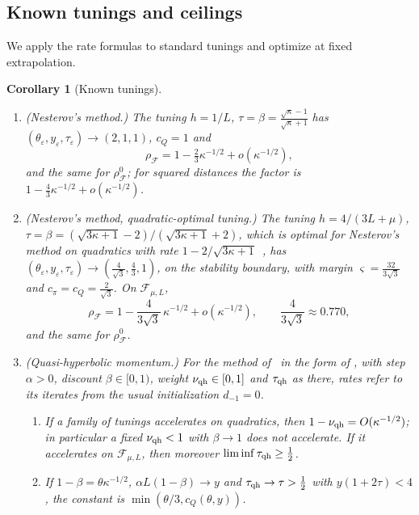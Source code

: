 \documentclass[11pt]{article}
\newtheorem{corollary}[theorem]{Corollary}
\theoremstyle{definition}
\theoremstyle{remark}
\newcommand{\cF}{\mathcal F}
\newcommand{\rhoF}{\rho_{\cF}}
\newcommand{\rhoz}{\rho_{\cF}^{0}}
\newcommand{\cQ}{c_{Q}}
\newcommand{\cpi}{c_{\pi}}
\begin{document}
\subsection{Known tunings and ceilings}
\label{sec:known}

We apply the rate formulas to standard tunings and optimize at fixed extrapolation.

\begin{corollary}[Known tunings]\label{cor:B}
\leavevmode
\begin{enumerate}[label=\textup{(\roman*)}]
\item \textup{(Nesterov's method.)}  The tuning \(h=1/L\), \(\tau=\beta=\frac{\sqrt\kappa-1}{\sqrt\kappa+1}\)
has \((\theta_\varepsilon,y_\varepsilon,\tau_\varepsilon)\to(2,1,1)\), \(\cQ=1\) and
\[
\rhoF=1-\tfrac23\kappa^{-1/2}+o(\kappa^{-1/2}),
\]
and the same for \(\rhoz\); for squared distances the factor is
\(1-\frac43\kappa^{-1/2}+o(\kappa^{-1/2})\).
\item \textup{(Nesterov's method, quadratic-optimal tuning.)}  The tuning
\(h=4/(3L+\mu)\), \(\tau=\beta=(\sqrt{3\kappa+1}-2)/(\sqrt{3\kappa+1}+2)\), which is optimal for Nesterov's
method on quadratics with rate \(1-2/\sqrt{3\kappa+1}\)~\cite[Proposition~1]{LRP16}, has
\((\theta_\varepsilon,y_\varepsilon,\tau_\varepsilon)\to(\frac4{\sqrt3},\frac43,1)\), on the stability boundary, with margin \(\varsigma=\frac{32}{3\sqrt3}\) and
\(\cpi=\cQ=\frac2{\sqrt3}\).  On \(\cF_{\mu,L}\),
\[
\rhoF=1-\frac4{3\sqrt3}\,\kappa^{-1/2}+o(\kappa^{-1/2}),\qquad \frac4{3\sqrt3}\approx0.770,
\]
and the same for \(\rhoz\).
\item \textup{(Quasi-hyperbolic momentum.)}  For the method of~\cite{MY19} in the form of
, with step \(\alpha>0\), discount \(\beta\in[0,1)\), weight \(\nu_{\rm qh}\in[0,1]\) and \(\tau_{\rm qh}\) as there, rates
refer to its iterates from the usual initialization \(d_{-1}=0\).
\begin{enumerate}[label=\textup{(\alph*)}]
\item If a family of tunings accelerates on quadratics, then \(1-\nu_{\rm qh}=O(\kappa^{-1/2})\); in
particular a fixed \(\nu_{\rm qh}<1\) with \(\beta\to1\) does not accelerate.  If it accelerates on
\(\cF_{\mu,L}\), then moreover \(\liminf\tau_{\rm qh}\ge\frac12\).
\item If \(1-\beta=\theta\kappa^{-1/2}\), \(\alpha L(1-\beta)\to y\) and \(\tau_{\rm qh}\to\tau>\frac12\) with \(y(1+2\tau)<4\), the
constant is \(\min(\theta/3,\cQ(\theta,y))\).
\end{enumerate}

\end{enumerate}
\end{corollary}
\end{document}

